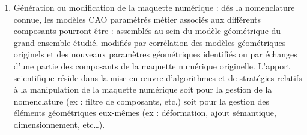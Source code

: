 \begin{enumerate}
  \item Génération ou modification de la maquette numérique : dés la nomenclature connue, les modèles CAO paramétrés métier associés aux différents composants pourront être :
assemblés au sein du modèle géométrique du grand ensemble étudié.
modifiés par corrélation des modèles géométriques originels et des nouveaux paramètres géométriques identifiés ou par échanges d’une partie des composants de la maquette numérique originelle. L’apport scientifique réside dans la mise en œuvre d’algorithmes et de stratégies relatifs à la manipulation de la maquette numérique soit pour la gestion de la nomenclature (ex : filtre de composants, etc.) soit pour la gestion des éléments géométriques eux-mêmes (ex : déformation, ajout sémantique, dimensionnement, etc\ldots).\\
\end{enumerate}

\clearpage
